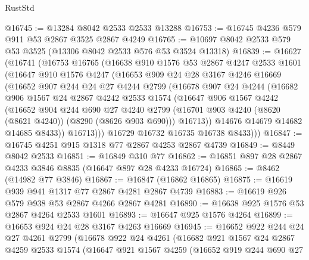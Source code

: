 \begin{lexlean}{RustStd}
\begin{coremodule}
@16745 := @13284 @8042 @2533 @2533 @13288
@16753 := @16745 @4236 @579 @911 @53 @2867 @3525 @2867 @4249
@16765 := @10697 @8042 @2533 @579 @53 @3525 (@13306 @8042 @2533 @576 @53 @3524 @13318)
@16839 := @16627
    (@16741
      (@16753
        @16765
        (@16638
          @910
          @1576
          @53
          @2867
          @4247
          @2533
          @1601
          (@16647
            @910
            @1576
            @4247
            (@16653
              @909
              @24
              @28
              @3167
              @4246
              @16669
              (@16652
                @907
                @244
                @24
                @27
                @4244
                @2799
                (@16678
                  @907
                  @24
                  @4244
                  (@16682
                    @906
                    @1567
                    @24
                    @2867
                    @4242
                    @2533
                    @1574
                    (@16647
                      @906
                      @1567
                      @4242
                      (@16652
                        @904
                        @244
                        @690
                        @27
                        @4240
                        @2799
                        (@16701 @903 @4240 (@8620 (@8621 @4240)) (@8290 (@8626 @903 @690)))
                        @16713))
                    @14676
                    @14679
                    @14682
                    @14685
                    @8433))
                @16713)))
          @16729
          @16732
          @16735
          @16738
          @8433)))
@16847 := @16745 @4251 @915 @1318 @77 @2867 @4253 @2867 @4739
@16849 := @8449 @8042 @2533
@16851 := @16849 @310 @77
@16862 := @16851 @897 @28 @2867 @4233 @3846 @8835 (@16647 @897 @28 @4233 @16724)
@16865 := @8462 (@14982 @77 @3846)
@16867 := @16847 (@16862 @16865)
@16875 := @16619 @939 @941 @1317 @77 @2867 @4281 @2867 @4739
@16883 := @16619 @926 @579 @938 @53 @2867 @4266 @2867 @4281
@16890 := @16638 @925 @1576 @53 @2867 @4264 @2533 @1601
@16893 := @16647 @925 @1576 @4264
@16899 := @16653 @924 @24 @28 @3167 @4263 @16669
@16945 := @16652
    @922
    @244
    @24
    @27
    @4261
    @2799
    (@16678
      @922
      @24
      @4261
      (@16682
        @921
        @1567
        @24
        @2867
        @4259
        @2533
        @1574
        (@16647
          @921
          @1567
          @4259
          (@16652
            @919
            @244
            @690
            @27

\end{coremodule}
\end{lexlean}
